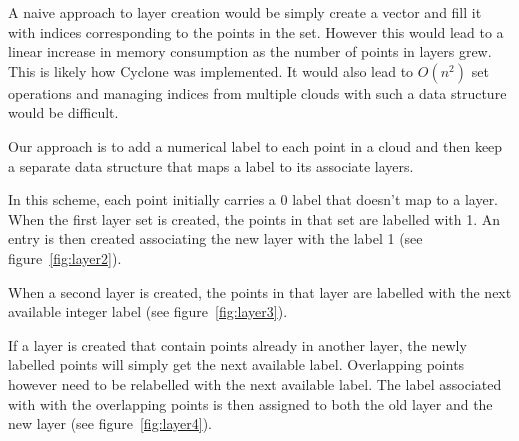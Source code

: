 A naive approach to layer creation would be simply create a vector and fill it with indices corresponding to the points in the set. However this would lead to a linear increase in memory consumption as the number of points in layers grew. This is likely how Cyclone was implemented. It would also lead to $O(n^{2})$ set operations and managing indices from multiple clouds with such a data structure would be difficult.

Our approach is to add a numerical label to each point in a cloud and then keep a separate data structure that maps a label to its associate layers.


In this scheme, each point initially carries a 0 label that doesn't map to a layer. When the first layer set is created, the points in that set are labelled with 1. An entry is then created associating the new layer with the label 1 (see figure~\ref{fig:layer2}).

When a second layer is created, the points in that layer are labelled with the next available integer label (see figure~\ref{fig:layer3}).

If a layer is created that contain points already in another layer, the newly labelled points will simply get the next available label. Overlapping points however need to be relabelled with the next available label. The label associated with with the overlapping points is then assigned to both the old layer and the new layer (see figure~\ref{fig:layer4}).


